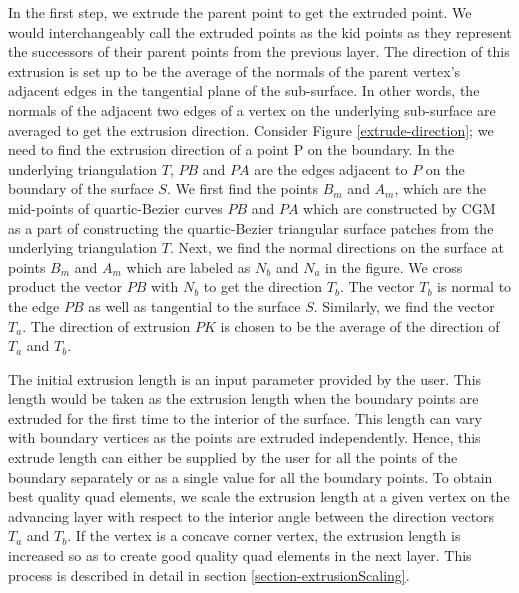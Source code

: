 \documentclass[conf]{new-aiaa}
\begin{document}
In the first step, we extrude the parent point to get the extruded point. We would interchangeably call the extruded points as the kid points as they represent the successors of their parent points from the previous layer. The direction of this extrusion is set up to be the average of the normals of the parent vertex's adjacent edges in the tangential plane of the sub-surface. In other words, the normals of the adjacent two edges of a vertex on the underlying sub-surface are averaged to get the extrusion direction. Consider Figure \ref{extrude-direction}; we need to find the extrusion direction of a point P on the boundary. In the underlying triangulation $T$, $PB$ and $PA$ are the edges adjacent to $P$ on the boundary of the surface $S$. We first find the points $B_m$ and $A_m$, which are the mid-points of quartic-Bezier curves $PB$ and $PA$ which are constructed by CGM as a part of constructing the quartic-Bezier triangular surface patches from the underlying triangulation $T$. Next, we find the normal directions on the surface at points $B_m$ and $A_m$ which are labeled as $N_b$ and $N_a$ in the figure. We cross product the vector $PB$ with $N_b$ to get the direction $T_b$. The vector $T_b$ is normal to the edge $PB$ as well as tangential to the surface $S$. Similarly, we find the vector $T_a$. The direction of extrusion $PK$ is chosen to be the average of the direction of $T_a$ and $T_b$.

The initial extrusion length is an input parameter provided by the user. This length would be taken as the extrusion length when the boundary points are extruded for the first time to the interior of the surface. This length can vary with boundary vertices as the points are extruded independently. Hence, this extrude length can either be supplied by the user for all the points of the boundary separately or as a single value for all the boundary points. To obtain best quality quad elements, we scale the extrusion length at a given vertex on the advancing layer with respect to the interior angle between the direction vectors $T_a$ and $T_b$. If the vertex is a concave corner vertex, the extrusion length is increased so as to create good quality quad elements in the next layer. This process is described in detail in section \ref{section-extrusionScaling}.%
\end{document}
